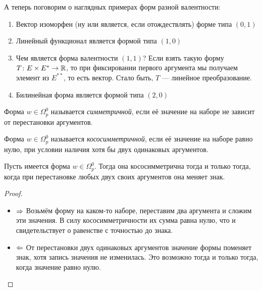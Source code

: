 \begin{example}
	А теперь поговорим о наглядных примерах форм разной валентности:
	\begin{enumerate}
		\item Вектор изоморфен (ну или является, если отождествлять) форме типа $(0, 1)$
		
		\item Линейный функционал является формой типа $(1, 0)$
		
		\item Чем является форма валентности $(1, 1)$? Если взять такую форму $T \colon E \times E^* \to \mathbb{R}$, то при фиксировании первого аргумента мы получаем элемент из $E^{**}$, то есть вектор. Стало быть, $T$ --- линейное преобразование.
		
		\item Билинейная форма является формой типа $(2, 0)$
	\end{enumerate}
\end{example}

\begin{definition}
	Форма $w \in \Omega_p^0$ называется \textit{симметричной}, если её значение на наборе не зависит от перестановки аргументов.
\end{definition}

\begin{definition}
	Форма $w \in \Omega_p^0$ называется \textit{кососимметричной}, если её значение на наборе равно нулю, при условии наличия хотя бы двух одинаковых аргументов.
\end{definition}

\begin{proposition}
	Пусть имеется форма $w \in \Omega_p^0$. Тогда она кососимметрична тогда и только тогда, когда при перестановке любых двух своих аргументов она меняет знак.
\end{proposition}

\begin{proof}~
	\begin{itemize}
		\item $\Rightarrow$ Возьмём форму на каком-то наборе, переставим два аргумента и сложим эти значения. В силу кососимметричности их сумма равна нулю, что и свидетельствует о равенстве с точностью до знака.
		
		\item $\Leftarrow$ От перестановки двух одинаковых аргументов значение формы поменяет знак, хотя запись значения не изменилась. Это возможно тогда и только тогда, когда значение равно нулю.
	\end{itemize}
\end{proof}

